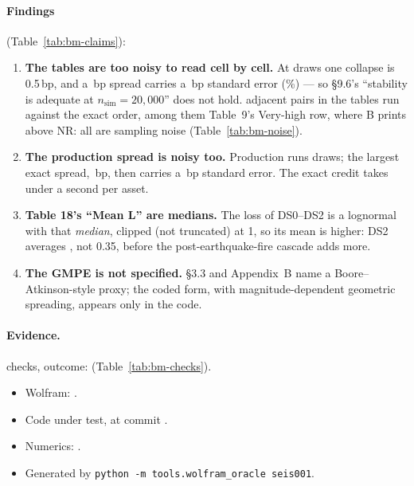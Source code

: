 \documentclass[11pt,a4paper]{article}
\begin{document}
\paragraph{Findings} (Table~\ref{tab:bm-claims}):
\begin{enumerate}[leftmargin=*]
\item \textbf{The tables are too noisy to read cell by cell.} At \bmNSim{} draws one
  collapse is 0.5\,bp, and a \bmStableExact\,bp spread carries a \bmStableSE\,bp standard
  error (\bmStableRel\%) --- so \S9.6's ``stability is adequate at $n_{\mathrm{sim}}=20{,}000$''
  does not hold. \bmReversals{} adjacent pairs in the tables run against the exact order,
  among them Table~9's Very-high row, where B prints above NR: all are sampling
  noise (Table~\ref{tab:bm-noise}).
\item \textbf{The production spread is noisy too.} Production runs \bmProductionN{} draws;
  the largest exact spread, \bmProdExact\,bp, then carries a \bmProdSE\,bp standard error.
  The exact credit takes under a second per asset.
\item \textbf{Table 18's ``Mean L'' are medians.} The loss of DS0--DS2 is a lognormal
  with that \emph{median}, clipped (not truncated) at 1, so its mean is higher: DS2
  averages \bmMeanTwo, not 0.35, before the post-earthquake-fire cascade adds more.
\item \textbf{The GMPE is not specified.} \S3.3 and Appendix~B name a
  Boore--Atkinson-style proxy; the coded form, with magnitude-dependent geometric
  spreading, appears only in the code.
\end{enumerate}

\paragraph{Evidence.} \bmChecks{} checks, outcome: \bmOutcome{}
(Table~\ref{tab:bm-checks}).
\begin{itemize}[leftmargin=*,nosep]
\item Wolfram: \bmWolfram{}\bmWolframVia.
\item Code under test, at commit \bmCodeCommit{}\bmCodeDirty.
\item Numerics: \bmNumerics.
\item Generated \bmGenerated{} by \texttt{python -m tools.wolfram\_oracle seis001}.
\end{itemize}

\mkmpurpose
\end{document}
